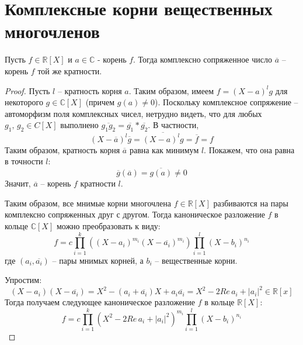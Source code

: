 \section{Комплексные корни вещественных многочленов}
\begin{theorem-non}
    Пусть $f \in \mathbb{R}[X]$ и $a \in \mathbb{C}$ - корень $f$. Тогда комплексно сопряженное число $\overline{a}$ -- корень $f$ той же кратности.
\end{theorem-non}

\begin{proof}
    Пусть $l$ -- кратность корня $a$. Таким образом, имеем $f = (X - a)^lg$ для некоторого $g \in \mathbb{C}[X]$ (причем $g(a) \neq 0$).
    Поскольку комплексное сопряжение -- автоморфизм поля комплексных чисел, нетрудно видеть, что для любых $g_1, \, g_2 \in C[X]$ выполнено $\overline{g_1g_2} = \overline{g_1} * \overline{g_2}$.
    В частности,
    \[ (X - \overline{a})^l\overline{g} = \overline{(X - a)^lg} = \overline{f} = f \]
    Таким образом, кратность корня $\overline{a}$ равна как минимум $l$. Покажем, что она равна в точности $l$:
    \[ \overline{g}(\overline{a}) = \overline{g(a)} \neq 0 \]
    Значит, $\overline{a}$ -- корень $f$ кратности $l$.

    \vspace{7mm}

    Таким образом, все мнимые корни многочлена $f \in \mathbb{R}[X]$ разбиваются на пары комплексно сопряженных друг с другом.
    Тогда каноническое разложение $f$ в кольце $\mathbb{C}[X]$ можно преобразовать к виду:
    \[ f = c \prod_{i = 1}^k ((X - a_i)^{m_i}(X - \overline{a_i})^{m_i}) \prod_{i = 1}^l (X - b_i)^{n_i} \]
    где $(a_i, \overline{a_i})$ -- пары мнимых корней, а $b_i$ -- вещественные корни.

    Упростим:
    \[ (X - a_i)(X - \overline{a_i}) = X^2 - (a_i + \overline{a_i})X + a_i\overline{a_i} = X^2 - 2Re \, a_i + |a_i|^2 \in \mathbb{R}[x] \]
    Тогда получаем следующее каноническое разложение $f$ в кольце $\mathbb{R}[X]$:
    \[ f = c \prod_{i = 1}^k (X^2 - 2Re \, a_i + |a_i|^2)^{m_i} \prod_{i = 1}^l (X - b_i)^{n_i} \] 
\end{proof}